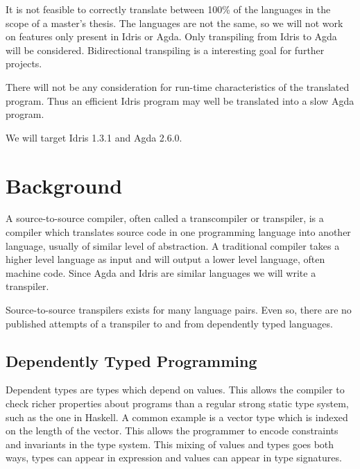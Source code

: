 \documentclass[parskip=half]{scrartcl}
\begin{document}
It is not feasible to correctly translate between 100\% of the
languages in the scope of a master's thesis.  The languages are not the same,
so we will not work on features only present in Idris or Agda.  Only
transpiling from Idris to Agda will be considered. Bidirectional transpiling is
a interesting goal for further projects.


There will not be any consideration for run-time characteristics of the
translated program.
Thus an efficient Idris program may well be translated into a slow Agda program.

We will target Idris 1.3.1 and Agda 2.6.0.

\section{Background}

A source-to-source compiler, often called a transcompiler or transpiler, is
a compiler which translates source code in one programming language into
another language, usually of similar level of abstraction. A traditional
compiler takes a higher level language as input and will output a lower level
language, often machine code.  Since Agda and Idris are similar languages we will write a transpiler.

Source-to-source transpilers exists for many language pairs. Even so, there are
no published attempts of a transpiler to and from dependently
typed languages.




\subsection{Dependently Typed Programming}

Dependent types are types which depend on values.
This allows the compiler to check richer properties about programs than
a regular strong static type system, such as the one in Haskell.
A common example is a vector type which is indexed on the length of
the vector. This allows the programmer to encode constraints and invariants in
the type system.
This mixing of values and types goes both ways, types can appear in expression
and values can appear in type signatures.
\end{document}
